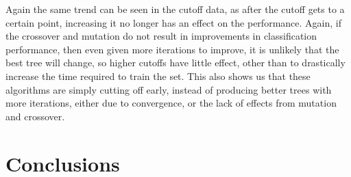 \documentclass[12pt, letterpaper]{article}
\begin{document}
Again the same trend can be seen in the cutoff data, as after the cutoff gets
to a certain point, increasing it no longer has an effect on the performance.  
Again, if the crossover and mutation do not result in improvements in 
classification performance, then even given more iterations to improve,
it is unlikely that the best tree will change, so higher cutoffs have little
effect, other than to drastically increase the time required to train the set. 
This also shows us that these algorithms are simply cutting off early, instead 
of producing better trees with more iterations, either due to convergence, or
the lack of effects from mutation and crossover.



\section{Conclusions}




\end{document}
